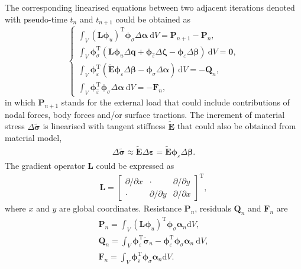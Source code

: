 \documentclass[3p,sort&compress,review,11pt]{elsarticle}
\newcommand*{\md}[1]{\mathrm{d}#1}
\newcommand*{\mT}{\mathrm{T}}
\begin{document}
The corresponding linearised equations between two adjacent iterations denoted with pseudo-time $t_n$ and $t_{n+1}$ could be obtained as
\begin{equation}
\left\{\begin{array}{l}
\displaystyle\int_V\left(\mathbold{L}\mathbold{\phi}_u\right)^\mT\mathbold{\phi}_\sigma\Delta\mathbold{\alpha}~\md{V}=\mathbold{P}_{n+1}-\mathbold{P}_n,\\[3mm]
\displaystyle\int_V\mathbold{\phi}_\sigma^\mT\left(\mathbold{L}\mathbold{\phi}_u\Delta\mathbold{q}+\mathbold{\phi}_{\hat{\varepsilon}}\Delta\mathbold{\zeta}-\mathbold{\phi}_\varepsilon\Delta\mathbold{\beta}\right)~\md{V}=\mathbold{0},\\[3mm]
\displaystyle\int_V\mathbold{\phi}_\varepsilon^\mT\left(\tilde{\mathbold{E}}\mathbold{\phi}_\varepsilon\Delta\mathbold{\beta}-\mathbold{\phi}_\sigma\Delta\mathbold{\alpha}\right)~\md{V}=-\mathbold{Q}_n,\\[3mm]
\displaystyle\int_V\mathbold{\phi}_{\hat{\varepsilon}}^\mT\mathbold{\phi}_\sigma\Delta\mathbold{\alpha}~\md{V}=-\mathbold{F}_n,
\end{array}\right.
\end{equation}
in which $\mathbold{P}_{n+1}$ stands for the external load that could include contributions of nodal forces, body forces and/or surface tractions. The increment of material stress $\Delta\tilde{\mathbold{\sigma}}$ is linearised with tangent stiffness $\tilde{\mathbold{E}}$ that could also be obtained from material model,
\begin{gather}
\Delta\tilde{\mathbold{\sigma}}\approx\tilde{\mathbold{E}}\Delta\mathbold{\varepsilon}=\tilde{\mathbold{E}}\mathbold{\phi}_\varepsilon\Delta\mathbold{\beta}.
\end{gather}
The gradient operator $\mathbold{L}$ could be expressed as
\begin{gather*}
\mathbold{L}=\begin{bmatrix}
\partial/\partial{}x&\cdot&\partial/\partial{}y\\[3mm]
\cdot&\partial/\partial{}y&\partial/\partial{}x
\end{bmatrix}^\mT,
\end{gather*}
where $x$ and $y$ are global coordinates. Resistance $\mathbold{P}_n$, residuals $\mathbold{Q}_n$ and $\mathbold{F}_n$ are
\begin{gather}
\mathbold{P}_n=\int_V\left(\mathbold{L}\mathbold{\phi}_u\right)^\mT\mathbold{\phi}_\sigma\mathbold{\alpha}_n\md{V},\\
\mathbold{Q}_n=\int_V\mathbold{\phi}_\varepsilon^\mT\tilde{\mathbold{\sigma}}_n-\mathbold{\phi}_\varepsilon^\mT\mathbold{\phi}_\sigma\mathbold{\alpha}_n~\md{V},\\
\mathbold{F}_n=\int_V\mathbold{\phi}_{\hat{\varepsilon}}^\mT\mathbold{\phi}_\sigma\mathbold{\alpha}_n\md{V}.
\end{gather}
\end{document}
